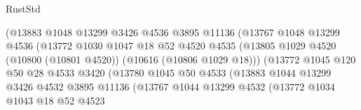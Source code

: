 \begin{lexlean}{RustStd}
\begin{coremodule}
                                    (@13883
                                      @1048
                                      @13299
                                      @3426
                                      @4536
                                      @3895
                                      @11136
                                      (@13767
                                        @1048
                                        @13299
                                        @4536
                                        (@13772
                                          @1030
                                          @1047
                                          @18
                                          @52
                                          @4520
                                          @4535
                                          (@13805
                                            @1029
                                            @4520
                                            (@10800 (@10801 @4520))
                                            (@10616 (@10806 @1029 @18)))
                                          (@13772
                                            @1045
                                            @120
                                            @50
                                            @28
                                            @4533
                                            @3420
                                            (@13780
                                              @1045
                                              @50
                                              @4533
                                              (@13883
                                                @1044
                                                @13299
                                                @3426
                                                @4532
                                                @3895
                                                @11136
                                                (@13767
                                                  @1044
                                                  @13299
                                                  @4532
                                                  (@13772
                                                    @1034
                                                    @1043
                                                    @18
                                                    @52
                                                    @4523

\end{coremodule}
\end{lexlean}
